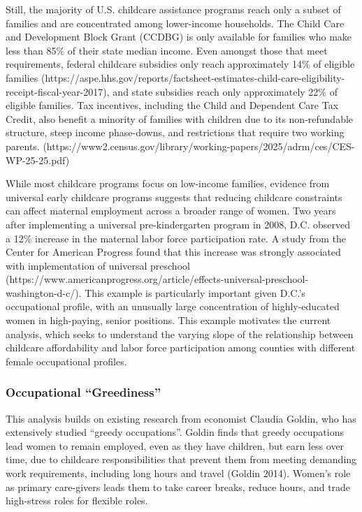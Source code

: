 \documentclass[
  letterpaper,
  DIV=11,
  numbers=noendperiod]{scrartcl}
\begin{document}
Still, the majority of U.S. childcare assistance programs reach only a
subset of families and are concentrated among lower-income households.
The Child Care and Development Block Grant (CCDBG) is only available for
families who make less than 85\% of their state median income. Even
amongst those that meet requirements, federal childcare subsidies only
reach approximately 14\% of eligible families
(https://aspe.hhs.gov/reports/factsheet-estimates-child-care-eligibility-receipt-fiscal-year-2017),
and state subsidies reach only approximately 22\% of eligible families.
Tax incentives, including the Child and Dependent Care Tax Credit, also
benefit a minority of families with children due to its non-refundable
structure, steep income phase-downs, and restrictions that require two
working parents.
(https://www2.census.gov/library/working-papers/2025/adrm/ces/CES-WP-25-25.pdf)

While most childcare programs focus on low-income families, evidence
from universal early childcare programs suggests that reducing childcare
constraints can affect maternal employment across a broader range of
women. Two years after implementing a universal pre-kindergarten program
in 2008, D.C. observed a 12\% increase in the maternal labor force
participation rate. A study from the Center for American Progress found
that this increase was strongly associated with implementation of
universal preschool
(https://www.americanprogress.org/article/effects-universal-preschool-washington-d-c/).
This example is particularly important given D.C.'s occupational
profile, with an unusually large concentration of highly-educated women
in high-paying, senior positions. This example motivates the current
analysis, which seeks to understand the varying slope of the
relationship between childcare affordability and labor force
participation among counties with different female occupational
profiles.

\subsubsection{Occupational
``Greediness''}\label{occupational-greediness}

This analysis builds on existing research from economist Claudia Goldin,
who has extensively studied ``greedy occupations''. Goldin finds that
greedy occupations lead women to remain employed, even as they have
children, but earn less over time, due to childcare responsibilities
that prevent them from meeting demanding work requirements, including
long hours and travel (Goldin 2014). Women's role as primary care-givers
leads them to take career breaks, reduce hours, and trade high-stress
roles for flexible roles.
\end{document}
